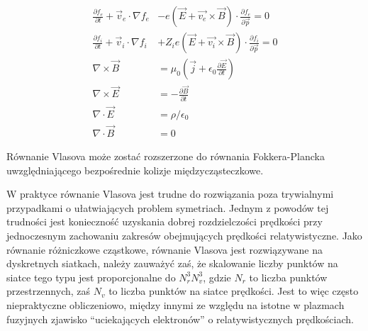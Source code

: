    \begin{align}
    \frac{\partial f_e}{\partial t} + \vec {v}_e\cdot\nabla f_e &- e\left(\vec {E}+\vec {v_e}\times\vec {B}\right)\cdot\frac{\partial f_e}{\partial\vec {p}} = 0
    \label{eqn:vlasov-electrons}\\
    \frac{\partial f_i}{\partial t} + \vec {v}_i\cdot\nabla f_i &+ Z_i e\left(\vec {E}+\vec {v_i}\times\vec {B}\right)\cdot\frac{\partial f_i}{\partial\vec {p}} = 0
    \label{eqn:vlasov-ions}\\
    \nabla\times\vec {B} &=\mu_0 \left(\vec{j}+\epsilon_0 \frac{\partial \vec {E}}{\partial t}\right)
    \label{eqn:maxwell-B-rotation}\\
    \nabla\times\vec {E} &=-\frac{\partial\vec {B}}{\partial t}
    \label{eqn:maxwell-E-rotation}\\
    \nabla\cdot\vec {E}  &=\rho / \epsilon_0
    \label{eqn:maxwell-E-div}\\
    \nabla\cdot\vec {B}  &=0
    \label{eqn:maxwell-B-div}
    \end{align}

    Równanie Vlasova może zostać rozszerzone do równania Fokkera-Plancka uwzględniającego
    bezpośrednie kolizje międzycząsteczkowe.

    W praktyce równanie Vlasova jest trudne do rozwiązania poza trywialnymi
    przypadkami o ułatwiających problem symetriach.  Jednym z powodów tej
    trudności jest konieczność uzyskania dobrej rozdzielczości prędkości przy
    jednoczesnym zachowaniu zakresów obejmujących prędkości relatywistyczne.
    Jako równanie różniczkowe cząstkowe, równanie Vlasova jest rozwiązywane na
    dyskretnych siatkach, należy zauważyć zaś, że skalowanie
    liczby punktów na siatce tego typu jest proporcjonalne do $N_r^3 N_v^3$,
    gdzie $N_r$ to liczba punktów przestrzennych, zaś $N_v$ to liczba punktów
    na siatce prędkości. Jest to więc często niepraktyczne obliczeniowo,
    między innymi ze względu na istotne w plazmach fuzyjnych zjawisko
    ``uciekających elektronów'' o relatywistycznych prędkościach.

